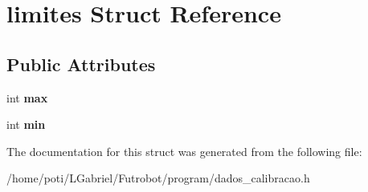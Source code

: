 \hypertarget{structlimites}{}\section{limites Struct Reference}
\label{structlimites}
\subsection*{Public Attributes}
\begin{DoxyCompactItemize}
\item 
int {\bfseries max}\hypertarget{structlimites_a9e6443d2fc9a21e876b5ec9d4094f6c6}{}\label{structlimites_a9e6443d2fc9a21e876b5ec9d4094f6c6}

\item 
int {\bfseries min}\hypertarget{structlimites_acfb6c85b45f0ded168387073e1821b1d}{}\label{structlimites_acfb6c85b45f0ded168387073e1821b1d}

\end{DoxyCompactItemize}


The documentation for this struct was generated from the following file\+:\begin{DoxyCompactItemize}
\item 
/home/poti/\+L\+Gabriel/\+Futrobot/program/dados\+\_\+calibracao.\+h\end{DoxyCompactItemize}
